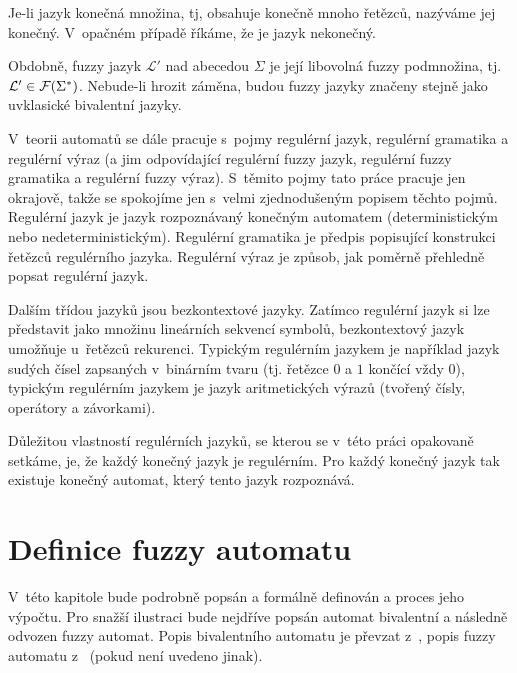 Je-li jazyk konečná množina, tj, obsahuje konečně mnoho řetězců, nazýváme jej konečný. V~opačném případě říkáme, že je jazyk nekonečný.

Obdobně, fuzzy jazyk $\mathcal{L}'$ nad abecedou $\Sigma$ je její libovolná fuzzy podmnožina, tj. $\mathcal{L}' \in \mathcal{F}(\Sigma^*)$. Nebude-li hrozit záměna, budou fuzzy jazyky značeny stejně jako uv{klasické} bivalentní jazyky.

\begin{note} \label{note:RegLangsExprsGrams}
 V~teorii automatů se dále pracuje s~pojmy regulérní jazyk, regulérní gramatika a regulérní výraz (a jim odpovídající regulérní fuzzy jazyk, regulérní fuzzy gramatika a regulérní fuzzy výraz). S~těmito pojmy tato práce pracuje jen okrajově, takže se spokojíme jen s~velmi zjednodušeným popisem těchto pojmů. Regulérní jazyk je jazyk rozpoznávaný konečným  automatem (deterministickým nebo nedeterministickým). Regulérní gramatika je předpis popisující konstrukci řetězců regulérního jazyka. Regulérní výraz je způsob, jak poměrně přehledně popsat regulérní jazyk.
 
 Dalším třídou jazyků jsou bezkontextové jazyky. Zatímco regulérní jazyk si lze představit jako množinu lineárních sekvencí symbolů, bezkontextový jazyk umožňuje u~řetězců rekurenci. Typickým regulérním jazykem je například jazyk sudých čísel zapsaných v~binárním tvaru (tj. řetězce $0$ a $1$ končící vždy $0$), typickým regulérním jazykem je jazyk aritmetických výrazů (tvořený čísly, operátory a závorkami).
 
 Důležitou vlastností regulérních jazyků, se kterou se v~této práci opakovaně setkáme, je, že každý konečný jazyk je regulérním. Pro každý konečný jazyk tak existuje konečný  automat, který tento jazyk rozpoznává.
\end{note}


\section{Definice fuzzy automatu}
V~této kapitole bude podrobně popsán a formálně definován  a proces jeho výpočtu. Pro snažší ilustraci bude nejdříve popsán automat bivalentní a následně odvozen fuzzy automat. Popis bivalentního automatu je převzat z~\cite{HopUl-IntrAutTheLangComp}, popis fuzzy automatu z~\cite{GonGar-FuzzLangInfRanAccGuzzAutPumLemDetProc} (pokud není uvedeno jinak).

